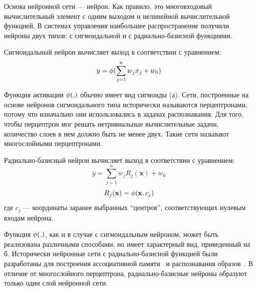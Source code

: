 Основа нейронной сети --- нейрон.  Как правило, это многовходовый
вычислительный элемент с одним выходом и нелинейной вычислительной
функцией.  В системах управления наибольшее распространение получили
нейроны двух типов: с сигмоидальной и с радиально-базисной функциями.

Сигмоидальный нейрон вычисляет выход в соответствии с уравнением:
\begin{equation}
\label{eq:sigm_neuron_output}
y=\fa(\sum_{j=1}^nw_j x_j+w_0)
\end{equation}

Функция активации $\phi(.)$ обычно имеет вид сигмоиды
(а).  Сети, построенные на основе нейронов
сигмоидального типа исторически называются перцептронами, потому что
изначально они использовались в задачах распознавания.  Для того,
чтобы перцептрон мог решать нетривиальные вычислительные задачи,
количество слоев в нем должно быть не менее двух.  Такие сети называют
многослойными перцептронами.

Радиально-базисный нейрон вычисляет выход в соответствии с уравнением:
\begin{equation}
\label{eq:rbf_neuron_output}
y=\sum_{j=1}^nw_j R_j(\mathbf{x})+w_0
\end{equation}
\begin{equation}
\label{eq:rb_function}
R_j(\mathbf{x})=\fa(\mathbf{x},c_j)
\end{equation} где $c_j$ --- координаты заранее выбранных ``центров'',
соответствующих нулевым входам нейрона.

Функция $\phi(.)$, как и в случае с сигмоидальным нейроном, может быть
реализована различными способами, но имеет характерный вид,
приведенный на б.  Исторически нейронные сети с
радиально-базисной функцией были разработаны для построения
ассоциативной памяти~\cite{koh80} и распознавания
образов~\cite{wasser92}.  В отличие от многослойного перцептрона,
радиально-базисные нейроны образуют только один слой нейронной сети.

